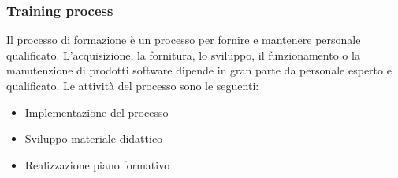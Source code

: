 \subsubsection{Training process}
Il processo di formazione è un processo per fornire e mantenere personale qualificato. L'acquisizione, la fornitura, lo sviluppo, il funzionamento o la manutenzione di prodotti software dipende in gran parte da personale esperto e qualificato.
Le attività del processo sono le seguenti:
\begin{itemize}
\item Implementazione del processo
\item Sviluppo materiale didattico
\item Realizzazione piano formativo
\end{itemize}
